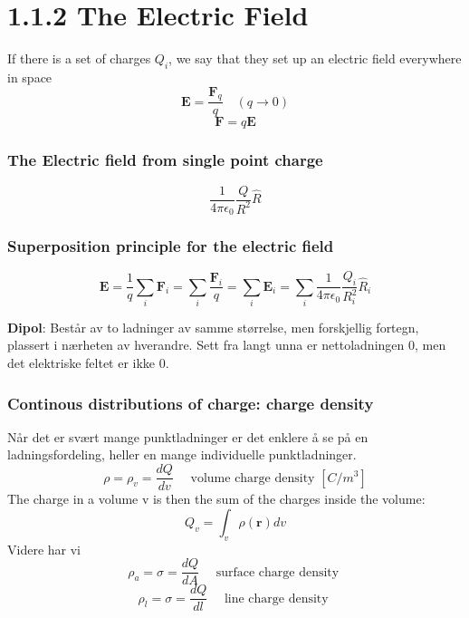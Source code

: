\documentclass[
12pt, reprint, aip, onecolumn, notitlepage
]{revtex4-1}
\begin{document}
\section{1.1.2 The Electric Field}
If there is a set of charges $Q_i$, we say that they set up an electric field everywhere in space
\begin{equation}
\mathbf{E}=\frac{\mathbf{F}_{q}}{q} \quad(q \rightarrow 0) 
\end{equation}
\begin{equation}
\mathbf{F}=q \mathbf{E}
\end{equation}
\subsubsection{The Electric field from single point charge}
\begin{equation}
\frac{1}{4 \pi \epsilon_{0}} \frac{Q}{R^{2}} \hat{R}
\end{equation}

\subsubsection{Superposition principle for the electric field}
\begin{equation}
\mathbf{E}=\frac{1}{q} \sum_{i} \mathbf{F}_{i}=\sum_{i} \frac{\mathbf{F}_{i}}{q}=\sum_{i} \mathbf{E}_{i}=\sum_{i} \frac{1}{4 \pi \epsilon_{0}} \frac{Q_{i}}{R_{i}^{2}} \hat{R}_{i}
\end{equation}

\textbf{Dipol}: Består av to ladninger av samme størrelse, men forskjellig fortegn, plassert i nærheten av hverandre. Sett fra langt unna er nettoladningen 0, men det elektriske feltet er ikke 0.

\subsubsection{Continous distributions of charge: charge density}
Når det er svært mange punktladninger er det enklere å se på en ladningsfordeling, heller en mange individuelle punktladninger. 
\begin{equation}
\rho=\rho_{v}=\frac{d Q}{d v} \quad \text { volume charge density } [C/m^3]
\end{equation}
The charge in a volume v is then the sum of the charges inside the volume:
\begin{equation}
Q_{v}=\int_{v} \rho(\mathbf{r}) d v
\end{equation}
Videre har vi 
\begin{equation}
\rho_{a}=\sigma=\frac{d Q}{d A} \quad \text { surface charge density }
\end{equation}
\begin{equation}
\rho_{l}=\sigma=\frac{d Q}{d l} \quad \text { line charge density }
\end{equation}
\end{document}
